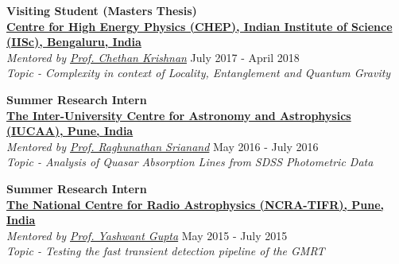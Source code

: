 \documentclass[margin, centered]{res}
\begin{document}
\begin{resume}
\textbf{Visiting Student (Masters Thesis)}
\\
\textbf{\href{http://chep.iisc.ac.in/}{Centre for High Energy Physics (CHEP), Indian Institute of Science (IISc), Bengaluru, India}}\\
\emph{Mentored by \href{http://chep.iisc.ac.in/Personnel/pages/chethan/index.html}{Prof. Chethan Krishnan}} \hfill July 2017 - April 2018\\
\textit{Topic - Complexity in context of Locality, Entanglement and Quantum Gravity}

\textbf{Summer Research Intern}
\\
\textbf{\href{http://www.iucaa.ernet.in/}{The Inter-University Centre for Astronomy and Astrophysics (IUCAA), Pune, India}}
\\
\emph{Mentored by \href{http://www.iucaa.ernet.in/~anand/}{Prof. Raghunathan Srianand}} \hfill May 2016 - July 2016\\
\textit{Topic - Analysis of Quasar Absorption Lines from SDSS Photometric Data}

\textbf{Summer Research Intern}\\
\textbf{\href{http://www.ncra.tifr.res.in/}{The National Centre for Radio Astrophysics (NCRA-TIFR), Pune, India}}\\
\emph{Mentored by \href{http://www.ncra.tifr.res.in/ncra/people/academic/ncra-faculty/Yashwant_Gupta}{Prof. Yashwant Gupta}} \hfill May 2015 - July 2015\\
\textit{Topic - Testing the fast transient detection pipeline of the GMRT}

\begin{comment}



\end{comment}
\end{resume}
\end{document}
